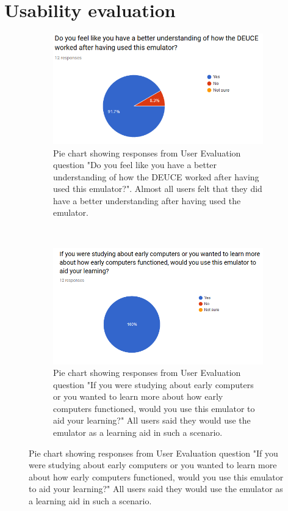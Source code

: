 \documentclass{l4proj}
\begin{document}
\section{Usability evaluation}

\begin{figure}[!t]
	\centering
	\begin{subfigure}[t]{0.45\textwidth}
		\includegraphics[width=\textwidth]{images/chart-5}
		\caption{Pie chart showing responses from User Evaluation question "Do you feel like you have a better understanding of how the DEUCE worked after having used this emulator?". Almost all users felt that they did have a better understanding after having used the emulator.}
		\label{fig:chart-5}
	\end{subfigure}
	~ %
	\begin{subfigure}[t]{0.45\textwidth}
		\includegraphics[width=\textwidth]{images/chart-6}
		\caption{Pie chart showing responses from User Evaluation question "If you were studying about early computers or you wanted to learn more about how early computers functioned, would you use this emulator to aid your learning?" All users said they would use the emulator as a learning aid in such a scenario.}

\end{subfigure}
\end{figure}
\end{document}
